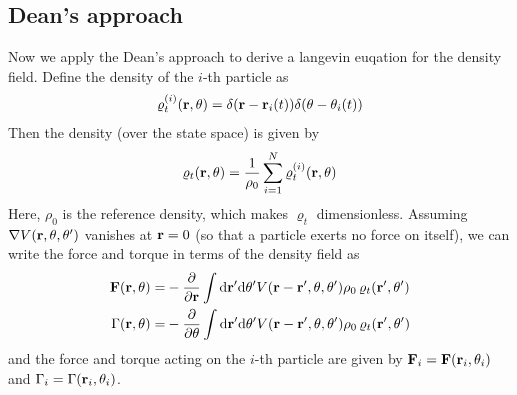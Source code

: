\documentclass[a5paper]{article}
\begin{document}
\subsection{Dean's approach}
Now we apply the Dean's approach \cite{dean1996} to derive a langevin euqation for the density field. 
Define the density of the $i$-th particle as
\begin{align}
    \label{rho-i-definition}
    \varrho^{(i)}_t(\mathbf{r}, \theta) = \delta(\mathbf{r}-\mathbf{r}_i(t)) \delta(\theta-\theta_i(t))
\end{align}
Then the density (over the state space) is given by
\begin{align}
    \label{varrho-definition}
    \varrho_t(\mathbf{r}, \theta) = \frac{1}{\rho_0}\sum_{i=1}^N \varrho^{(i)}_t(\mathbf{r}, \theta)
\end{align}
Here, $\rho_0$ is the reference density, which makes $\varrho_t$ dimensionless.
Assuming $\nabla V(\mathbf{r},\theta,\theta')$ vanishes at $\mathbf{r}=0$ (so that a particle exerts no force on itself), we can write the force and torque in terms of the density field as
\begin{align}
    \label{F-rho}
    \mathbf{F}(\mathbf{r},\theta) =& -\frac{\partial }{\partial \mathbf{r}}\int \mathrm{d}\mathbf{r}' \mathrm{d}\theta' 
    V(\mathbf{r}-\mathbf{r}', \theta, \theta') \rho_0\,\varrho_t(\mathbf{r}', \theta') 
    \\ 
    \Gamma(\mathbf{r},\theta) =& -\frac{\partial }{\partial \theta}\int \mathrm{d}\mathbf{r}' \mathrm{d}\theta' 
    V(\mathbf{r}-\mathbf{r}', \theta, \theta') \rho_0\,\varrho_t(\mathbf{r}', \theta') 
\end{align}
and the force and torque acting on the $i$-th particle are given by $\mathbf{F}_i = \mathbf{F}(\mathbf{r}_i, \theta_i)$ and $\Gamma_i = \Gamma(\mathbf{r}_i, \theta_i)$.
\end{document}

